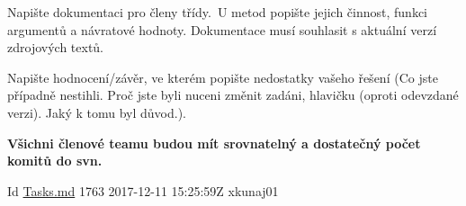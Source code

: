 \begin{DoxyEnumerate}
\item Napište dokumentaci pro členy třídy.\+ U metod popište jejich činnost, funkci argumentů a návratové hodnoty. Dokumentace musí souhlasit s aktuální verzí zdrojových textů.~\newline
~\newline

\item Napište hodnocení/závěr, ve kterém popište nedostatky vašeho řešení (Co jste případně nestihli. Proč jste byli nuceni změnit zadáni, hlavičku (oproti odevzdané verzi). Jaký k tomu byl důvod.).~\newline
~\newline

\item {\bfseries Všichni členové teamu budou mít srovnatelný a dostatečný počet komitů do svn.} ~\newline
~\newline
\begin{DoxyParagraph}{Id}
\hyperlink{_tasks_8md}{Tasks.\+md} 1763 2017-\/12-\/11 15\+:25\+:59Z xkunaj01 
\end{DoxyParagraph}

\end{DoxyEnumerate}